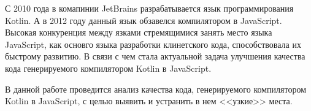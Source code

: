 С 2010 года в комапинии JetBrains разрабатывается язык программирования Kotlin. А в 2012 году данный язык обзавелся компилятором в JavaScript. Высокая конкуренция между язками стремящимися занять место языка JavaScript, как основго языка разработки клинетского кода, способствовала их быстрому развитию. В связи с чем стала актуальной задача улучшения качества кода генерируемого компилятором Kotlin в JavaScript.

В данной работе проведится анализ качества кода, генерируемого компилятором Kotlin в JavaScript, с целью выявить и устранить в нем <<узкие>> места. %





